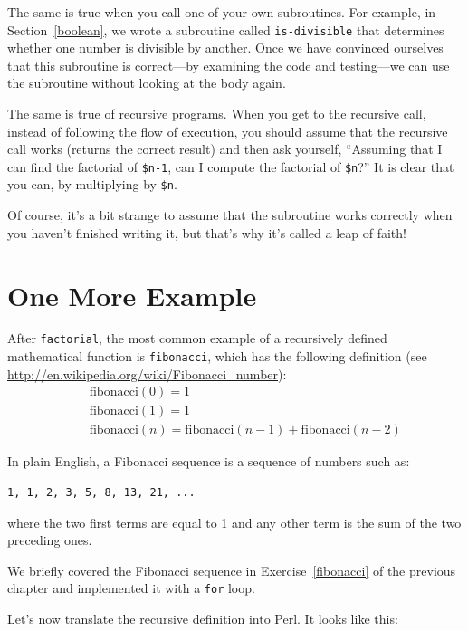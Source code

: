 The same is true when you call one of your own subroutines.  For
example, in Section~\ref{boolean}, we wrote a subroutine called 
\verb"is-divisible" that determines whether one number is divisible by
another.  Once we have convinced ourselves that this subroutine is
correct---by examining the code and testing---we can use the subroutine without looking at the body again.

The same is true of recursive programs.  When you get to the recursive
call, instead of following the flow of execution, you should assume
that the recursive call works (returns the correct result) and then ask
yourself, ``Assuming that I can find the factorial of \verb"$n-1", can I
compute the factorial of \verb"$n"?''  It is clear that you
can, by multiplying by \verb"$n".

Of course, it's a bit strange to assume that the subroutine works
correctly when you haven't finished writing it, but that's why
it's called a leap of faith!


\section{One More Example}
\label{one.more.example}

After {\tt factorial}, the most common example of a recursively
defined mathematical function is {\tt fibonacci}, which has the
following definition (see
  \url{http://en.wikipedia.org/wiki/Fibonacci_number}):
%
\begin{eqnarray*}
&& \mathrm{fibonacci}(0) = 1 \\
&& \mathrm{fibonacci}(1) = 1 \\
&& \mathrm{fibonacci}(n) = \mathrm{fibonacci}(n-1) + \mathrm{fibonacci}(n-2)
\end{eqnarray*}
%

In plain English, a Fibonacci sequence is a sequence of numbers 
such as:
\begin{verbatim}
1, 1, 2, 3, 5, 8, 13, 21, ...
\end{verbatim}
where the two first terms are equal to 1 and any other term is the 
sum of the two preceding ones.

We briefly covered the Fibonacci sequence in Exercise~\ref{fibonacci} 
of the previous chapter and implemented it with a {\tt for} loop.

Let's now translate the recursive definition into Perl. It looks like this:

